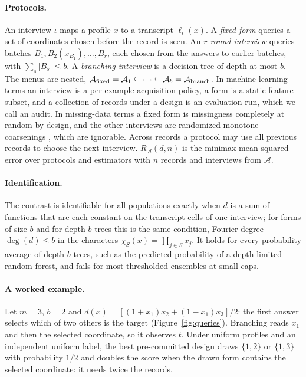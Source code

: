 \documentclass{article}
\newcommand{\A}{\mathcal A}
\begin{document}
\paragraph{Protocols.}
An interview $\iota$ maps a profile $x$ to a transcript $\ell_\iota(x)$. A \emph{fixed form} queries a set of coordinates chosen before the record is seen. An \emph{$r$-round interview} queries batches $B_1,B_2(x_{B_1}),\ldots,B_r$, each chosen from the answers to earlier batches, with $\sum_s|B_s|\le b$. A \emph{branching interview} is a decision tree of depth at most $b$. The menus are nested, $\A_{\rm fixed}=\A_1\subseteq\cdots\subseteq\A_b=\A_{\rm branch}$. In machine-learning terms an interview is a per-example acquisition policy, a form is a static feature subset, and a collection of records under a design is an evaluation run, which we call an audit. In missing-data terms a fixed form is missingness completely at random by design, and the other interviews are randomized monotone coarsenings \citep{gill1997}, which are ignorable. Across records a protocol may use all previous records to choose the next interview. $R_\A(d,n)$ is the minimax mean squared error over protocols and estimators with $n$ records and interviews from $\A$.

\paragraph{Identification.}
The contrast is identifiable for all populations exactly when $d$ is a sum of functions that are each constant on the transcript cells of one interview; for forms of size $b$ and for depth-$b$ trees this is the same condition, Fourier degree $\deg(d)\le b$ in the characters $\chi_S(x)=\prod_{j\in S}x_j$. It holds for every probability average of depth-$b$ trees, such as the predicted probability of a depth-limited random forest, and fails for most thresholded ensembles at small caps.

\paragraph{A worked example.}
Let $m=3$, $b=2$ and $d(x)=[(1+x_1)x_2+(1-x_1)x_3]/2$: the first answer selects which of two others is the target (Figure~\ref{fig:queries}). Branching reads $x_1$ and then the selected coordinate, so it observes $t$. Under uniform profiles and an independent uniform label, the best pre-committed design draws $\{1,2\}$ or $\{1,3\}$ with probability $1/2$ and doubles the score when the drawn form contains the selected coordinate: it needs twice the records.
\end{document}
